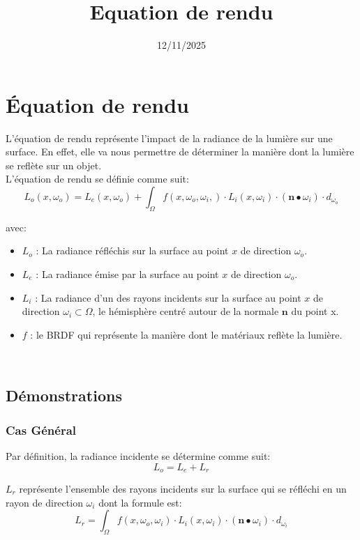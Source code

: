 \documentclass{article}
\title{Equation de rendu}
\author{}
\date{12/11/2025}
\begin{document}
    \maketitle

    \section{Équation de rendu}
    L'équation de rendu représente l'impact de la radiance de la lumière sur une surface. En effet, elle va nous permettre de déterminer la manière dont la lumière se reflète sur un objet. \\
 
    
    L'équation de rendu se définie comme suit:\\
    $$\boxed{L_{o}\left(x, \omega_o\right) = L_{e}\left(x, \omega_o\right) + \int_{\Omega}f\left(x, \omega_o, \omega_i,\right)\cdot L_{i}\left(x, \omega_i\right)\cdot \left(\textbf{n}\bullet\omega_{i}\right)\cdot d_{\omega_o}}$$
    
    avec: 
	\begin{itemize}
  		\item[$\_$] $L_o$ : La radiance réfléchis sur la surface au point $x$ de direction $\omega_o$.
  		\item[$\_$] $L_e$ : La radiance émise par la surface au point $x$ de direction $\omega_o$.
  		\item[$\_$] $L_i$ : La radiance d'un des rayons incidents sur la surface au point $x$ de direction $\omega_i\subset\Omega$, le hémisphère centré autour de la normale $\textbf{n}$ du point x.
  		\item[$\_$] $f$ : le BRDF qui représente la manière dont le matériaux reflète la lumière.
	\end{itemize}\
	
	\subsection{Démonstrations}
	
    \subsubsection{Cas Général}
	
	Par définition, la radiance incidente se détermine comme suit:\\
    $$L_{o} = L_{e} + L_{r}$$
    
    $L_r$ représente l'ensemble des rayons incidents sur la surface qui se réfléchi en un rayon de direction $\omega_i$ dont la formule est:
    $$L_r = \int_{\Omega}f\left(x, \omega_o, \omega_i\right)\cdot L_{i}\left(x, \omega_i\right)\cdot \left(\textbf{n}\bullet\omega_{i}\right)\cdot d_{\omega_i}$$
    
\end{document}
